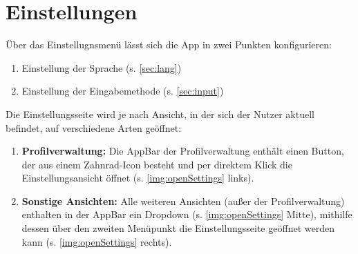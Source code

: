 \chapter{Einstellungen}
\label{chap:settings}

Über das Einstellugnsmenü lässt sich die App in zwei Punkten konfigurieren:

\begin{enumerate}
	\item Einstellung der Sprache (s. \cref{sec:lang})
	\item Einstellung der Eingabemethode (s. \cref{sec:input})
\end{enumerate}

Die Einstellungsseite wird je nach Ansicht, in der sich der Nutzer aktuell befindet, auf verschiedene Arten geöffnet:

\begin{enumerate}
	\item \textbf{Profilverwaltung:} Die AppBar der Profilverwaltung enthält einen Button, der aus einem Zahnrad-Icon besteht und per direktem Klick die Einstellungsansicht öffnet (s. \cref{img:openSettings} links).
	\item \textbf{Sonstige Ansichten:} Alle weiteren Ansichten (außer der Profilverwaltung) enthalten in der AppBar ein Dropdown (s. \cref{img:openSettings} Mitte), mithilfe dessen über den zweiten Menüpunkt die Einstellungsseite geöffnet werden kann (s. \cref{img:openSettings} rechts).
\end{enumerate}

